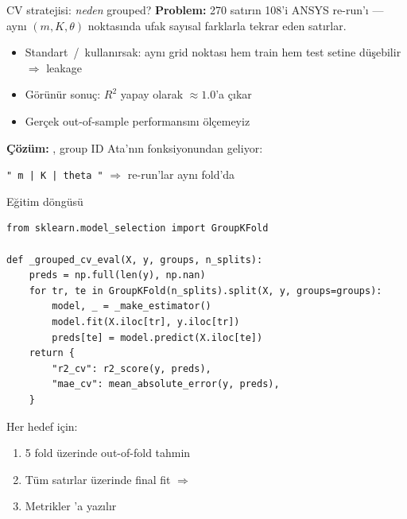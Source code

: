 \begin{frame}{CV stratejisi: \textit{neden} grouped?}
  \textbf{Problem:} 270 satırın 108'i ANSYS re-run'ı --- aynı
  \((m, K, \theta)\) noktasında ufak sayısal farklarla tekrar eden satırlar.

  \vspace{0.3cm}
  \begin{itemize}
    \item Standart \,/\, kullanırsak: aynı grid noktası
          hem train hem test setine düşebilir \(\Rightarrow\) \alert{leakage}
    \item Görünür sonuç: \(R^2\) yapay olarak \(\approx 1.0\)'a çıkar
    \item Gerçek out-of-sample performansını ölçemeyiz
  \end{itemize}

  \vspace{0.4cm}
  \textbf{Çözüm:} , group ID Ata'nın
   fonksiyonundan geliyor:
  \begin{center}
    \texttt{"\,m\,|\,K\,|\,theta\,"} \quad \(\Rightarrow\) \quad re-run'lar aynı fold'da
  \end{center}
\end{frame}

\begin{frame}[fragile]{Eğitim döngüsü}
\begin{lstlisting}
from sklearn.model_selection import GroupKFold

def _grouped_cv_eval(X, y, groups, n_splits):
    preds = np.full(len(y), np.nan)
    for tr, te in GroupKFold(n_splits).split(X, y, groups=groups):
        model, _ = _make_estimator()
        model.fit(X.iloc[tr], y.iloc[tr])
        preds[te] = model.predict(X.iloc[te])
    return {
        "r2_cv": r2_score(y, preds),
        "mae_cv": mean_absolute_error(y, preds),
    }
\end{lstlisting}

  \vspace{0.3cm}
  Her hedef için:
  \begin{enumerate}\small
    \item 5 fold üzerinde out-of-fold tahmin
    \item Tüm satırlar üzerinde final fit \(\Rightarrow\) 
    \item Metrikler 'a yazılır
  \end{enumerate}
\end{frame}

